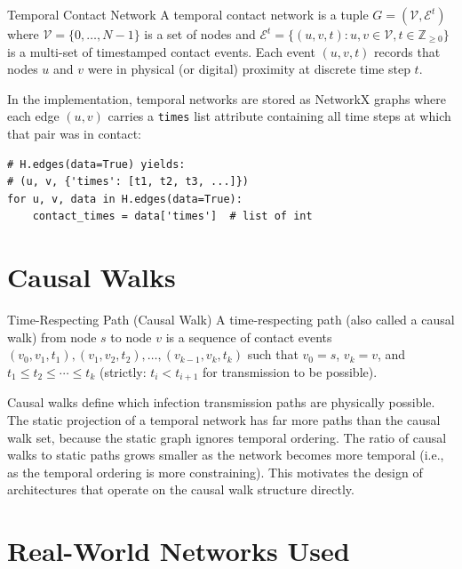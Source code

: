 \documentclass[12pt,a4paper]{report}
\newcommand{\calV}{\mathcal{V}}
\newcommand{\calE}{\mathcal{E}}
\begin{document}
\begin{definition}{Temporal Contact Network}
A temporal contact network is a tuple $G = (\calV, \calE^t)$ where $\calV =
\{0,\ldots,N-1\}$ is a set of nodes and $\calE^t = \{(u,v,t) : u,v \in \calV,
t \in \mathbb{Z}_{\geq 0}\}$ is a multi-set of timestamped contact events. Each
event $(u,v,t)$ records that nodes $u$ and $v$ were in physical (or digital)
proximity at discrete time step $t$.
\end{definition}

In the implementation, temporal networks are stored as NetworkX graphs where
each edge $(u,v)$ carries a \texttt{times} list attribute containing all time
steps at which that pair was in contact:
\begin{lstlisting}[caption={Edge data structure for temporal graphs.}]
# H.edges(data=True) yields:
# (u, v, {'times': [t1, t2, t3, ...]})
for u, v, data in H.edges(data=True):
    contact_times = data['times']  # list of int
\end{lstlisting}

\section{Causal Walks}

\begin{definition}{Time-Respecting Path (Causal Walk)}
A time-respecting path (also called a causal walk) from node $s$ to node $v$
is a sequence of contact events $(v_0, v_1, t_1), (v_1, v_2, t_2), \ldots,
(v_{k-1}, v_k, t_k)$ such that $v_0 = s$, $v_k = v$, and $t_1 \leq t_2 \leq
\cdots \leq t_k$ (strictly: $t_i < t_{i+1}$ for transmission to be possible).
\end{definition}

Causal walks define which infection transmission paths are physically possible.
The static projection of a temporal network has far more paths than the causal
walk set, because the static graph ignores temporal ordering. The ratio of
causal walks to static paths grows smaller as the network becomes more temporal
(i.e., as the temporal ordering is more constraining). This motivates the
design of architectures that operate on the causal walk structure directly.

\section{Real-World Networks Used}
\end{document}
